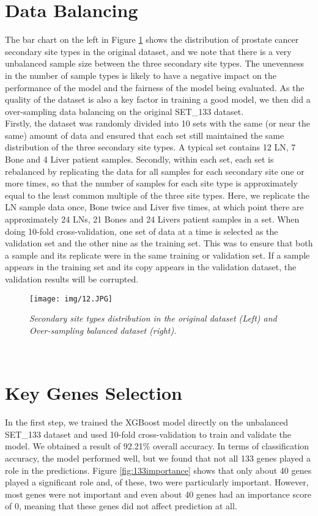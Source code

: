 \documentclass[12pt,a4paper]{report}
\begin{document}
\section{Data Balancing}
The bar chart on the left in Figure \ref{fig:databal} shows the distribution of prostate cancer secondary site types in the original dataset, and we note that there is a very unbalanced sample size between the three secondary site types. The unevenness in the number of sample types is likely to have a negative impact on the performance of the model and the fairness of the model being evaluated. As the quality of the dataset is also a key factor in training a good model, we then did a over-sampling data balancing on the original SET\_133 dataset.\\

Firstly, the dataset was randomly divided into 10 sets with the same (or near the same) amount of data and ensured that each set still maintained the same distribution of the three secondary site types. A typical set contains 12 LN, 7 Bone and 4 Liver patient samples. Secondly, within each set, each set is rebalanced by replicating the data for all samples for each secondary site one or more times, so that the number of samples for each site type is approximately equal to the least common multiple of the three site types. Here, we replicate the LN sample data once, Bone twice and Liver five times, at which point there are approximately 24 LNs, 21 Bones and 24 Livers patient samples in a set. When doing 10-fold cross-validation, one set of data at a time is selected as the validation set and the other nine as the training set. This was to ensure that both a sample and its replicate were in the same training or validation set. If a sample appears in the training set and its copy appears in the validation dataset, the validation results will be corrupted. \\  

\begin{figure}[h!]
\centering
\texttt{[image: img/12.JPG]}
\caption{\textit{Secondary site types distribution in the original dataset (Left) and Over-sampling balanced dataset (right).}}
\label{fig:databal}
\end{figure}\\

\section{Key Genes Selection }
In the first step, we trained the XGBoost model directly on the unbalanced SET\_133 dataset and used 10-fold cross-validation to train and validate the model. We obtained a result of 92.21\% overall accuracy. In terms of classification accuracy, the model performed well, but we found that not all 133 genes played a role in the predictions. Figure \ref{fig:133importance} shows that only about 40 genes played a significant role and, of these, two were particularly important. However, most genes were not important and even about 40 genes had an importance score of 0, meaning that these genes did not affect prediction at all.
\end{document}
